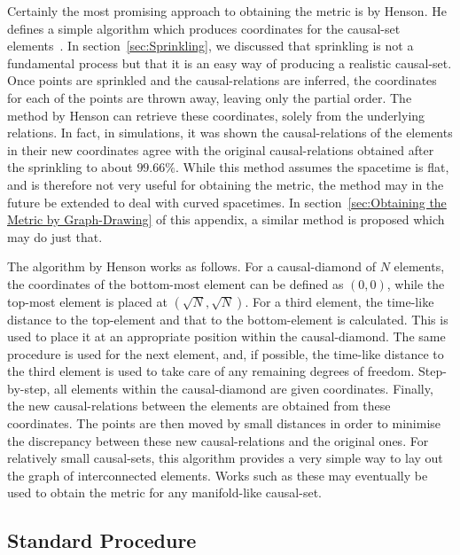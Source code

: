 \documentclass[a4paper,12pt]{article}
\numberwithin{equation}{section}
\begin{document}
Certainly the most promising approach to obtaining the metric is by Henson. He defines a simple algorithm which produces coordinates for the causal-set elements~\cite{Henson2006}. In section~\ref{sec:Sprinkling}, we discussed that sprinkling is not a fundamental process but that it is an easy way of producing a realistic causal-set. Once points are sprinkled and the causal-relations are inferred, the coordinates for each of the points are thrown away, leaving only the partial order. The method by Henson can retrieve these coordinates, solely from the underlying relations. In fact, in simulations, it was shown the causal-relations of the elements in their new coordinates agree with the original causal-relations obtained after the sprinkling to about $99.66\%$. While this method assumes the spacetime is flat, and is therefore not very useful for obtaining the metric, the method may in the future be extended to deal with curved spacetimes. In section~\ref{sec:Obtaining the Metric by Graph-Drawing} of this appendix, a similar method is proposed which may do just that.

The algorithm by Henson works as follows. For a causal-diamond of $N$ elements, the coordinates of the bottom-most element can be defined as $(0,0)$, while the top-most element is placed at $(\sqrt{N},\sqrt{N})$. For a third element, the time-like distance to the top-element and that to the bottom-element is calculated. This is used to place it at an appropriate position within the causal-diamond. The same procedure is used for the next element, and, if possible, the time-like distance to the third element is used to take care of any remaining degrees of freedom. Step-by-step, all elements within the causal-diamond are given coordinates. Finally, the new causal-relations between the elements are obtained from these coordinates. The points are then moved by small distances in order to minimise the discrepancy between these new causal-relations and the original ones. For relatively small causal-sets, this algorithm provides a very simple way to lay out the graph of interconnected elements. Works such as these may eventually be used to obtain the metric for any manifold-like causal-set.


\subsection{Standard Procedure}
\label{sec:Standard Procedure}
\end{document}
